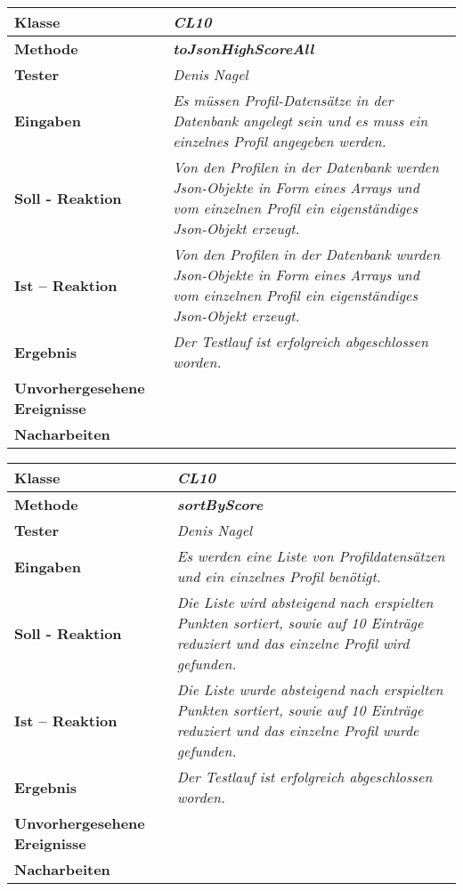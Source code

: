 \begin{longtable}{|p{4cm}|p{11cm}|}
\hline
\textbf{Klasse} & \textit{\textbf{CL10}} \\
\hline
\textbf{Methode} & \textit{\textbf{toJsonHighScoreAll}} \\
\hline
\textbf{Tester} & \textit{Denis Nagel} \\
\hline
\textbf{Eingaben} & \textit{Es müssen Profil-Datensätze in der Datenbank angelegt sein und es muss ein einzelnes Profil angegeben werden.} \\
\hline
\textbf{Soll - Reaktion} & \textit{Von den Profilen in der Datenbank werden Json-Objekte in Form eines Arrays und vom einzelnen Profil ein eigenständiges Json-Objekt erzeugt.} \\
\hline
\textbf{Ist -- Reaktion} & \textit{Von den Profilen in der Datenbank wurden Json-Objekte in Form eines Arrays und vom einzelnen Profil ein eigenständiges Json-Objekt erzeugt.} \\
\hline
\textbf{Ergebnis} & \textit{Der Testlauf ist erfolgreich abgeschlossen worden.} \\
\hline
\textbf{Unvorhergesehene Ereignisse} &
\textit{} \\
\hline
\textbf{Nacharbeiten } & \textit{} \\
\hline
\end{longtable}

\begin{longtable}{|p{4cm}|p{11cm}|}
\hline
\textbf{Klasse} & \textit{\textbf{CL10}} \\
\hline
\textbf{Methode} & \textit{\textbf{sortByScore}} \\
\hline
\textbf{Tester} & \textit{Denis Nagel} \\
\hline
\textbf{Eingaben} & \textit{Es werden eine Liste von Profildatensätzen und ein einzelnes Profil benötigt.} \\
\hline
\textbf{Soll - Reaktion} & \textit{Die Liste wird absteigend nach erspielten Punkten sortiert, sowie auf 10 Einträge reduziert und das einzelne Profil wird gefunden.} \\
\hline
\textbf{Ist -- Reaktion} & \textit{Die Liste wurde absteigend nach erspielten Punkten sortiert, sowie auf 10 Einträge reduziert und das einzelne Profil wurde gefunden.} \\
\hline
\textbf{Ergebnis} & \textit{Der Testlauf ist erfolgreich abgeschlossen worden.} \\
\hline
\textbf{Unvorhergesehene Ereignisse} &
\textit{} \\
\hline
\textbf{Nacharbeiten } & \textit{} \\
\hline
\end{longtable}

